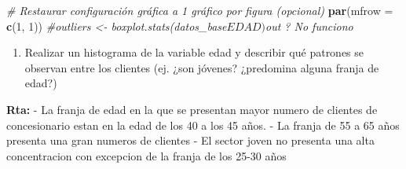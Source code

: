 \documentclass[
]{article}
\newenvironment{Shaded}{\begin{snugshade}}{\end{snugshade}}
\newcommand{\AttributeTok}[1]{\textcolor[rgb]{0.13,0.29,0.53}{#1}}
\newcommand{\CommentTok}[1]{\textcolor[rgb]{0.56,0.35,0.01}{\textit{#1}}}
\newcommand{\DecValTok}[1]{\textcolor[rgb]{0.00,0.00,0.81}{#1}}
\newcommand{\FunctionTok}[1]{\textcolor[rgb]{0.13,0.29,0.53}{\textbf{#1}}}
\newcommand{\NormalTok}[1]{#1}
\providecommand{\tightlist}{%
  \setlength{\itemsep}{0pt}\setlength{\parskip}{0pt}}
\begin{document}
\begin{Shaded}
\begin{Highlighting}[]
\CommentTok{\# Restaurar configuración gráfica a 1 gráfico por figura (opcional)}
\FunctionTok{par}\NormalTok{(}\AttributeTok{mfrow =} \FunctionTok{c}\NormalTok{(}\DecValTok{1}\NormalTok{, }\DecValTok{1}\NormalTok{))}
\CommentTok{\#outliers \textless{}{-} boxplot.stats(datos\_base$EDAD)$out ? No funciono }
\end{Highlighting}
\end{Shaded}

\begin{enumerate}
\def\labelenumi{\alph{enumi}.}
\setcounter{enumi}{2}
\tightlist
\item
  Realizar un histograma de la variable edad y describir qué patrones se
  observan entre los clientes (ej. ¿son jóvenes? ¿predomina alguna
  franja de edad?)
\end{enumerate}

\textbf{Rta: } - La franja de edad en la que se presentan mayor numero
de clientes de concesionario estan en la edad de los 40 a los 45 años. -
La franja de 55 a 65 años presenta una gran numeros de clientes - El
sector joven no presenta una alta concentracion con excepcion de la
franja de los 25-30 años
\end{document}

